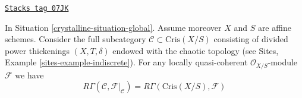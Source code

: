 \begin{lemma}[Compare]
\label{crystalline-lemma-compare}
\href{https://stacks.math.columbia.edu/tag/07JK}{\texttt{Stacks tag 07JK}}

In Situation \ref{crystalline-situation-global}.
Assume moreover $X$ and $S$ are affine schemes.
Consider the full subcategory $\mathcal{C} \subset \text{Cris}(X/S)$
consisting of divided power thickenings $(X, T, \delta)$
endowed with the chaotic topology (see
Sites, Example \ref{sites-example-indiscrete}).
For any locally quasi-coherent $\mathcal{O}_{X/S}$-module $\mathcal{F}$
we have
$$
R\Gamma(\mathcal{C}, \mathcal{F}|_\mathcal{C}) =
R\Gamma(\text{Cris}(X/S), \mathcal{F})
$$
\end{lemma}


